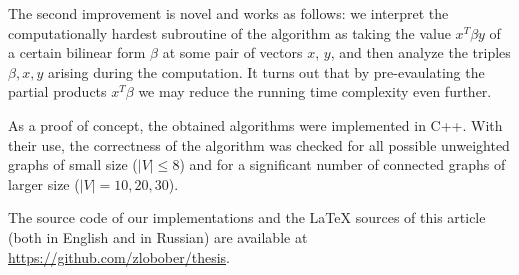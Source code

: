 The second improvement is novel and works as follows: we interpret the computationally hardest subroutine of the algorithm as taking the value $x^T\beta y$ of a certain bilinear form $\beta$ at some pair of vectors $x$, $y$, and then analyze the triples $\beta, x, y$ arising during the computation. It turns out that by pre-evaulating the partial products $x^T \beta$ we may reduce the running time complexity even further.

As a proof of concept, the obtained algorithms were implemented in C++. With their use, the correctness of the algorithm was checked for all possible unweighted graphs of small size ($|V| \leq 8$) and for a significant number of connected graphs of larger size ($|V| = 10, 20, 30$). 

The source code of our implementations and the LaTeX sources of this article (both in English and in Russian) are available at \url{https://github.com/zlobober/thesis}.
